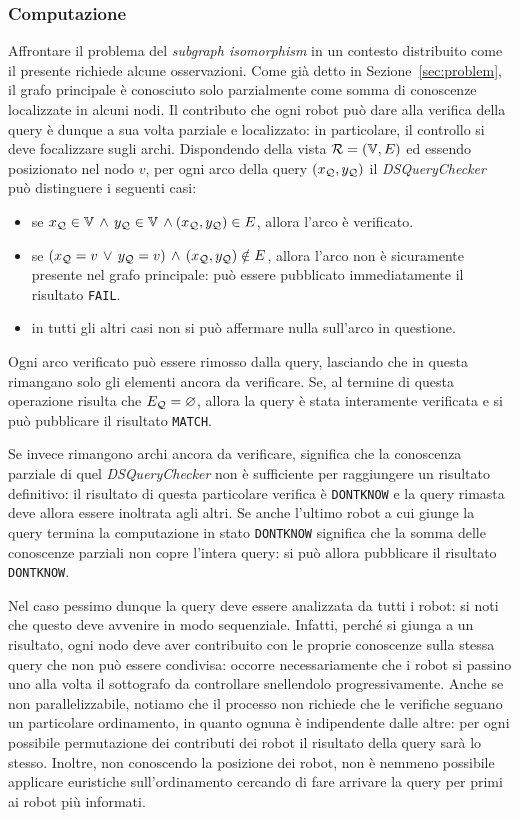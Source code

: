 \subsubsection*{Computazione}
Affrontare il problema del \emph{subgraph isomorphism} in un
contesto distribuito come il presente richiede alcune osservazioni.
Come già detto in Sezione~\ref{sec:problem}, il grafo principale
è conosciuto solo parzialmente come somma di conoscenze localizzate
in alcuni nodi.
Il contributo che ogni robot può dare alla verifica della query
è dunque a sua volta parziale e localizzato: in particolare,
il controllo si deve focalizzare sugli archi.
Dispondendo della vista $\mathcal{R} = (\mathbb{V}, E)$ ed essendo posizionato
nel nodo $v$, per ogni arco della query $(x_{\mathcal{Q}}, y_{\mathcal{Q}})$
il \emph{DSQueryChecker} può distinguere i seguenti casi:
\begin{itemize}
\item se \(x_{\mathcal{Q}} \in \mathbb{V}\,\wedge\,y_{\mathcal{Q}} \in \mathbb{V}\,
  \wedge (x_{\mathcal{Q}}, y_{\mathcal{Q}}) \in E\), allora l'arco è verificato.
\item se \((x_{\mathcal{Q}} = v\,\vee\,y_{\mathcal{Q}} = v)\,
  \wedge\,(x_{\mathcal{Q}}, y_{\mathcal{Q}}) \notin E\),
  allora l'arco non è sicuramente presente nel grafo principale:
  può essere pubblicato immediatamente il risultato \texttt{FAIL}.
\item in tutti gli altri casi non si può affermare nulla
  sull'arco in questione.
\end{itemize}
%
Ogni arco verificato può essere rimosso dalla query, lasciando
che in questa rimangano solo gli elementi ancora da verificare.
Se, al termine di questa operazione risulta che $E_{\mathcal{Q}} = \varnothing$,
allora la query è stata interamente verificata e si può
pubblicare il risultato \texttt{MATCH}.

Se invece rimangono archi ancora da verificare, significa che
la conoscenza parziale di quel \emph{DSQueryChecker} non è
sufficiente per raggiungere un risultato definitivo:
il risultato di questa particolare verifica è \texttt{DONTKNOW}
e la query rimasta deve allora essere inoltrata agli altri.
Se anche l'ultimo robot a cui giunge la query termina la
computazione in stato \texttt{DONTKNOW} significa che la somma
delle conoscenze parziali non copre l'intera query: si può
allora pubblicare il risultato \texttt{DONTKNOW}.

Nel caso pessimo dunque la query deve essere analizzata da tutti
i robot: si noti che questo deve avvenire in modo sequenziale.
Infatti, perché si giunga a un risultato, ogni nodo deve aver
contribuito con le proprie conoscenze sulla stessa query che
non può essere condivisa: occorre necessariamente che i robot
si passino uno alla volta il sottografo da controllare
snellendolo progressivamente. Anche se non parallelizzabile,
notiamo che il processo non richiede che le verifiche seguano
un particolare ordinamento, in quanto ognuna è indipendente
dalle altre: per ogni possibile permutazione dei contributi dei
robot il risultato della query sarà lo stesso.
Inoltre, non conoscendo la posizione dei robot, non è nemmeno
possibile applicare euristiche sull'ordinamento cercando
di fare arrivare la query per primi ai robot più informati.

